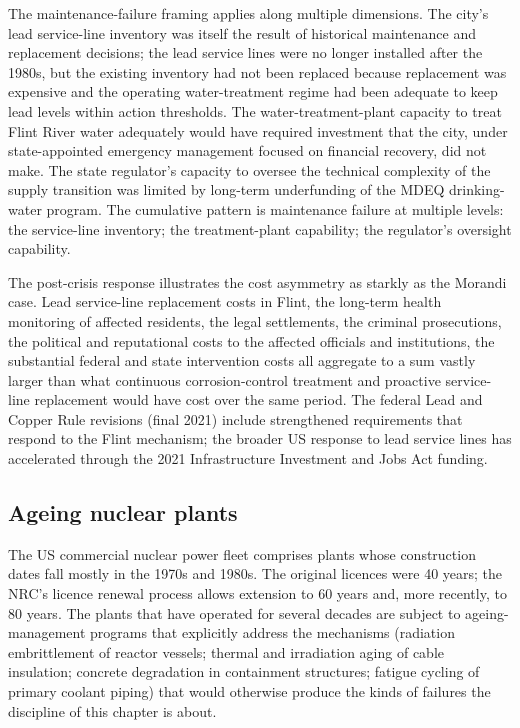The maintenance-failure framing applies along multiple dimensions. The city's lead service-line inventory was itself the result of historical maintenance and replacement decisions; the lead service lines were no longer installed after the 1980s, but the existing inventory had not been replaced because replacement was expensive and the operating water-treatment regime had been adequate to keep lead levels within action thresholds. The water-treatment-plant capacity to treat Flint River water adequately would have required investment that the city, under state-appointed emergency management focused on financial recovery, did not make. The state regulator's capacity to oversee the technical complexity of the supply transition was limited by long-term underfunding of the MDEQ drinking-water program. The cumulative pattern is maintenance failure at multiple levels: the service-line inventory; the treatment-plant capability; the regulator's oversight capability.

The post-crisis response illustrates the cost asymmetry as starkly as the Morandi case. Lead service-line replacement costs in Flint, the long-term health monitoring of affected residents, the legal settlements, the criminal prosecutions, the political and reputational costs to the affected officials and institutions, the substantial federal and state intervention costs all aggregate to a sum vastly larger than what continuous corrosion-control treatment and proactive service-line replacement would have cost over the same period. The federal Lead and Copper Rule revisions (final 2021) include strengthened requirements that respond to the Flint mechanism; the broader US response to lead service lines has accelerated through the 2021 Infrastructure Investment and Jobs Act funding.

\subsection*{Ageing nuclear plants}

The US commercial nuclear power fleet comprises plants whose construction dates fall mostly in the 1970s and 1980s. The original licences were 40 years; the NRC's licence renewal process allows extension to 60 years and, more recently, to 80 years. The plants that have operated for several decades are subject to ageing-management programs that explicitly address the mechanisms (radiation embrittlement of reactor vessels; thermal and irradiation aging of cable insulation; concrete degradation in containment structures; fatigue cycling of primary coolant piping) that would otherwise produce the kinds of failures the discipline of this chapter is about.

